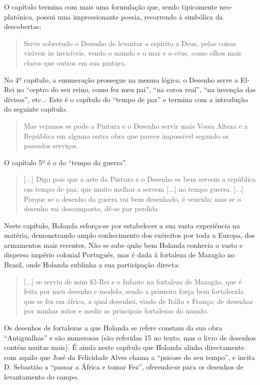 \documentclass{article}
\begin{document}
O capítulo termina com mais uma formulação que, sendo tipicamente
neo-platónica, possui uma impressionante poesia, recorrendo à
simbólica da descobertas:

\begin{quote}
  Serve sobretudo o Desenho de levantar o espírito a Deus, pelas
  coisas visíveis às invisíveis, vendo o mundo e o mar e o céus, como
  olhos mais claros que outros em sua pintura.
\end{quote}

No 4º capítulo, a enumeração prossegue na mesma lógica: o Desenho
serve a El-Rei no ``ceptro do seu reino, como fez meu pai'', ``na
coroa real'', ``na invenção das divisas'', etc... Este é o capítulo do
``tempo de paz'' e termina com a introdução do seguinte capítulo.

\begin{quote}
  Mas vejamos se pode a Pintura e o Desenho servir mais Vossa Alteza e
  a República em alguma outra obra que parece impossível segundo os
  passados serviços.
\end{quote}

O capítulo 5º é o do ``tempo da guerra''.

\begin{quote}
  [...] Digo pois que a arte da Pintura e o Desenho se bem servem a
  república em tempo de paz, que muito melhor a servem [...] no tempo
  guerra. [...] Porque se o desenho da guerra vai bem desenhado, é
  vencida; mas se o desenho vai descomposto, dê-se por perdida
\end{quote}

Neste capítulo, Holanda esforça-se por estabelecer a sua vasta
experiência na matéria, demonstrando amplo conhecimento dos exércitos
por toda a Europa, dos armamentos mais recentes. Não se sabe quão bem
Holanda conhecia o vasto e disperso império colonial Português, mas é
dada à fortaleza de Mazagão no Brasil, onde Holanda sublinha a sua
participação directa:

\begin{quote}
  [...] se serviu de mim El-Rei e o Infante na fortaleza de Mazagão,
  que é feita por meu desenho e modelo, sendo a primeira força bem
  fortalecida que se fez em áfrica, a qual desenhei, vindo de Itália e
  França: de desenhar por minhas mãos e medir as principais fortalezas
  do mundo.
\end{quote}

Os desenhos de fortalezas a que Holanda se refere constam da sua obra
``Antigualhas'' e são numerosas (são referidas 15 no texto, mas o
livro de desenhos contém muitas mais). É ainda neste capítulo que
Holanda alinha directamente com aquilo que José da Felicidade Alves
chama a ``psicose do seu tempo''\cite[notas p.54]{holanda}, e incita
D. Sebastião a ``passar a África e tomar Fez'', oferendo-se para os
desenhos de levantamento do campo.
\end{document}
